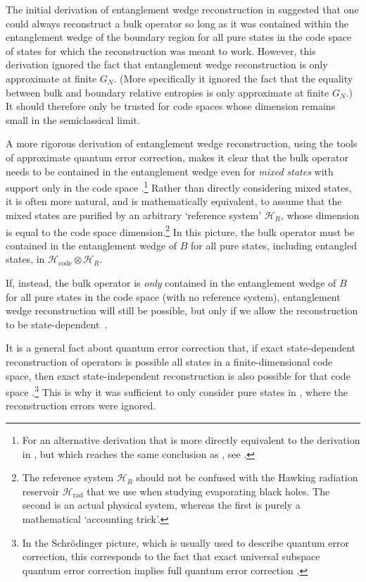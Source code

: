 \documentclass[12pt]{article}
\begin{document}
The initial derivation of entanglement wedge reconstruction in \cite{dong2016reconstruction} suggested that one could always reconstruct a bulk operator so long as it was contained within the entanglement wedge of the boundary region for all pure states in the code space of states for which the reconstruction was meant to work. However, this derivation ignored the fact that entanglement wedge reconstruction is only approximate at finite $G_N$. (More specifically it ignored the fact that the equality between bulk and boundary relative entropies \cite{jafferis2016relative} is only approximate at finite $G_N$.) It should therefore only be trusted for code spaces whose dimension remains small in the semiclassical limit.

A more rigorous derivation of entanglement wedge reconstruction, using the tools of approximate quantum error correction, makes it clear that the bulk operator needs to be contained in the entanglement wedge even for \emph{mixed states} with support only in the code space \cite{cotler2017entanglement}.\footnote{For an alternative derivation that is more directly equivalent to the derivation in \cite{dong2016reconstruction}, but which reaches the same conclusion as \cite{cotler2017entanglement}, see \cite{hayden2018learning}.} Rather than directly considering mixed states, it is often more natural, and is mathematically equivalent, to assume that the mixed states are purified by an arbitrary `reference system' $\mathcal{H}_R$, whose dimension is equal to the code space dimension.\footnote{The reference system $\mathcal{H}_R$ should not be confused with the Hawking radiation reservoir $\mathcal{H}_\text{rad}$ that we use when studying evaporating black holes. The second is an actual physical system, whereas the first is purely a mathematical `accounting trick'.} In this picture, the bulk operator must be contained in the entanglement wedge of $B$ for all pure states, including entangled states, in $\mathcal{H}_\text{code} \otimes \mathcal{H}_R$.

If, instead, the bulk operator is \emph{only} contained in the entanglement wedge of $B$ for all pure states in the code space (with no reference system), entanglement wedge reconstruction will still be possible, but only if we allow the reconstruction to be state-dependent~\cite{hayden2018learning}. 

It is a general fact about quantum error correction that, if exact state-dependent reconstruction of operators is possible all states in a finite-dimensional code space, then exact state-independent reconstruction is also possible for that code space \cite{alphabits,hayden2018learning}.\footnote{In the Schr\"{o}dinger picture, which is usually used to describe quantum error correction, this corresponds to the fact that exact universal subspace quantum error correction implies full quantum error correction \cite{alphabits}.} This is why it was sufficient to only consider pure states in \cite{dong2016reconstruction}, where the reconstruction errors were ignored. 
\end{document}
